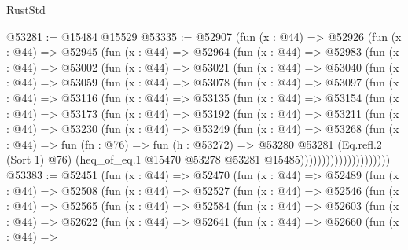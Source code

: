 \begin{lexlean}{RustStd}
\begin{coremodule}
@53281 := @15484 @15529
@53335 := @52907
    (fun (x : @44) =>
    @52926
      (fun (x : @44) =>
      @52945
        (fun (x : @44) =>
        @52964
          (fun (x : @44) =>
          @52983
            (fun (x : @44) =>
            @53002
              (fun (x : @44) =>
              @53021
                (fun (x : @44) =>
                @53040
                  (fun (x : @44) =>
                  @53059
                    (fun (x : @44) =>
                    @53078
                      (fun (x : @44) =>
                      @53097
                        (fun (x : @44) =>
                        @53116
                          (fun (x : @44) =>
                          @53135
                            (fun (x : @44) =>
                            @53154
                              (fun (x : @44) =>
                              @53173
                                (fun (x : @44) =>
                                @53192
                                  (fun (x : @44) =>
                                  @53211
                                    (fun (x : @44) =>
                                    @53230
                                      (fun (x : @44) =>
                                      @53249
                                        (fun (x : @44) =>
                                        @53268
                                          (fun (x : @44) =>
                                          fun (fn : @76) =>
                                          fun (h : @53272) =>
                                          @53280
                                            @53281
                                            (Eq.refl.{2} (Sort 1) @76)
                                            (heq_of_eq.{1}
                                              @15470
                                              @53278
                                              @53281
                                              @15485)))))))))))))))))))))
@53383 := @52451
    (fun (x : @44) =>
    @52470
      (fun (x : @44) =>
      @52489
        (fun (x : @44) =>
        @52508
          (fun (x : @44) =>
          @52527
            (fun (x : @44) =>
            @52546
              (fun (x : @44) =>
              @52565
                (fun (x : @44) =>
                @52584
                  (fun (x : @44) =>
                  @52603
                    (fun (x : @44) =>
                    @52622
                      (fun (x : @44) =>
                      @52641
                        (fun (x : @44) =>
                        @52660
                          (fun (x : @44) =>

\end{coremodule}
\end{lexlean}
